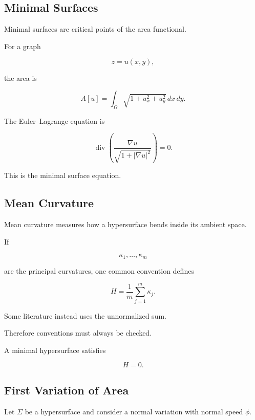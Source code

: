 \subsection{Minimal Surfaces}
\label{subsec:geometric-minimal-surfaces}

Minimal surfaces are critical points of the area functional.

For a graph

\[
z=u(x,y),
\]

the area is

\[
\boxed{
A[u]
=
\int_\Omega
\sqrt{
1+u_x^2+u_y^2
}
\,dx\,dy.
}
\]

The Euler--Lagrange equation is

\[
\boxed{
\operatorname{div}
\left(
\frac{\nabla u}
{\sqrt{1+|\nabla u|^2}}
\right)
=
0.
}
\]

This is the minimal surface equation.

\subsection{Mean Curvature}
\label{subsec:mean-curvature}

Mean curvature measures how a hypersurface bends inside its ambient
space.

If

\[
\kappa_1,\ldots,\kappa_m
\]

are the principal curvatures, one common convention defines

\[
\boxed{
H
=
\frac{1}{m}
\sum_{j=1}^{m}\kappa_j.
}
\]

Some literature instead uses the unnormalized sum.

Therefore conventions must always be checked.

A minimal hypersurface satisfies

\[
\boxed{
H=0.
}
\]

\subsection{First Variation of Area}
\label{subsec:first-variation-area}

Let \(\Sigma\) be a hypersurface and consider a normal variation with
normal speed \(\phi\).

